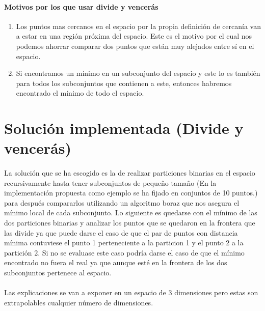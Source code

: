 \documentclass{article}
\begin{document}
	\paragraph{Motivos por los que usar divide y vencerás}

		\begin{enumerate}

			\item
			Los puntos mas cercanos en el espacio por la propia definición de cercanía van a estar en una región próxima del espacio. Este es el motivo por el cual nos podemos ahorrar comparar dos puntos que están muy alejados entre sí en el espacio.
			\item
			Si encontramos un mínimo en un subconjunto del espacio y este lo es también para todos los subconjuntos que contienen a este, entonces habremos encontrado el mínimo de todo el espacio.

		\end{enumerate}

\section{Solución implementada (Divide y vencerás)}

	\paragraph{}
	La solución que se ha escogido es la de realizar particiones binarias en el espacio recursivamente hasta tener subconjuntos de pequeño tamaño (En la implementación propuesta como ejemplo se ha fijado en conjuntos de 10 puntos.) para después compararlos utilizando un algoritmo boraz que nos asegura el mínimo local de cada subconjunto. Lo siguiente es quedarse con el mínimo de las dos particiones binarias y analizar los puntos que se quedaron en la frontera que las divide ya que puede darse el caso de que el par de puntos con distancia mínima contuviese el punto 1 perteneciente a la particion 1 y el punto 2 a la partición 2. Si no se evaluase este caso podría darse el caso de que el mínimo encontrado no fuera el real ya que aunque esté en la frontera de los dos subconjuntos pertenece al espacio.
	

	\paragraph{}
	Las explicaciones se van a exponer en un espacio de 3 dimensiones pero estas son extrapolables cualquier número de dimensiones.
\end{document}

